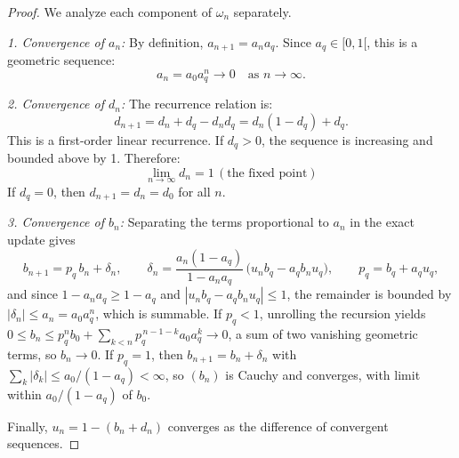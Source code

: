 \begin{proof}
We analyze each component of $\omega_n$ separately.

\emph{1. Convergence of $a_n$:}  
By definition, $a_{n+1} = a_n a_q$. Since $a_q \in [0,1[$, this is a geometric sequence:
\[
a_n = a_0 a_q^n \to 0 \quad \text{as } n \to \infty.
\]

\emph{2. Convergence of $d_n$:}  
The recurrence relation is:
\[
d_{n+1} = d_n + d_q - d_n d_q = d_n (1 - d_q) + d_q.
\]
This is a first-order linear recurrence. If $d_q > 0$, the sequence is increasing and bounded above by 1. Therefore:
\[
\lim_{n \to \infty} d_n = 1\, (\text{the fixed point})
\]
If $d_q = 0$, then $d_{n+1} = d_n = d_0$ for all $n$.

\emph{3. Convergence of $b_n$:}
Separating the terms proportional to $a_n$ in the exact update gives
\[
b_{n+1} = p_q\, b_n + \delta_n, \qquad
\delta_n = \frac{a_n (1 - a_q)}{1 - a_n a_q}\,\big(u_n b_q - a_q b_n u_q\big),
\qquad p_q = b_q + a_q u_q,
\]
and since $1 - a_n a_q \geq 1 - a_q$ and $|u_n b_q - a_q b_n u_q| \leq 1$, the remainder is bounded by $|\delta_n| \leq a_n = a_0 a_q^n$, which is summable. If $p_q < 1$, unrolling the recursion yields $0 \leq b_n \leq p_q^n b_0 + \sum_{k<n} p_q^{\,n-1-k} a_0 a_q^k \to 0$, a sum of two vanishing geometric terms, so $b_n \to 0$. If $p_q = 1$, then $b_{n+1} = b_n + \delta_n$ with $\sum_k |\delta_k| \leq a_0/(1-a_q) < \infty$, so $(b_n)$ is Cauchy and converges, with limit within $a_0/(1-a_q)$ of $b_0$.

Finally, $u_n = 1 - (b_n + d_n)$ converges as the difference of convergent sequences.
\end{proof}


